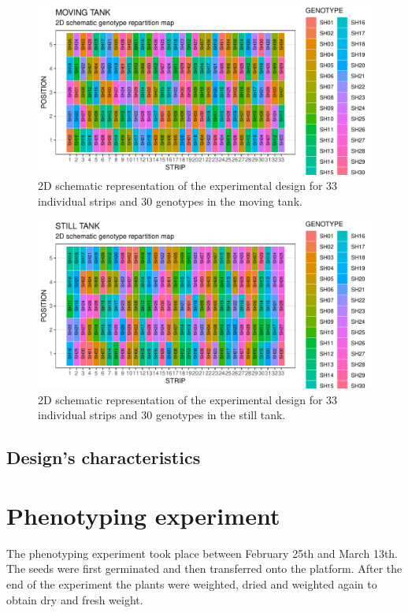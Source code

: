 \begin{figure}
    \includegraphics[width=\textwidth]{figures/moving_layout_30_genotypes.pdf} 
    \caption{2D schematic representation of the experimental design for 33 individual strips and 30 genotypes in the moving tank.}
    \label{fig:moving_layout_30_geno}
\end{figure}

\begin{figure}
    \includegraphics[width=\textwidth]{figures/still_layout_30_genotypes.pdf} 
    \caption{2D schematic representation of the experimental design for 33 individual strips and 30 genotypes in the still tank.}
    \label{fig:still_layout_30_geno}
\end{figure}

\subsection{Design's characteristics}


\section{Phenotyping experiment}
The phenotyping experiment took place between February 25th and March 13th. The seeds were first germinated and then transferred onto the platform. After the end of the experiment the plants were weighted, dried and weighted again to obtain dry and fresh weight.

